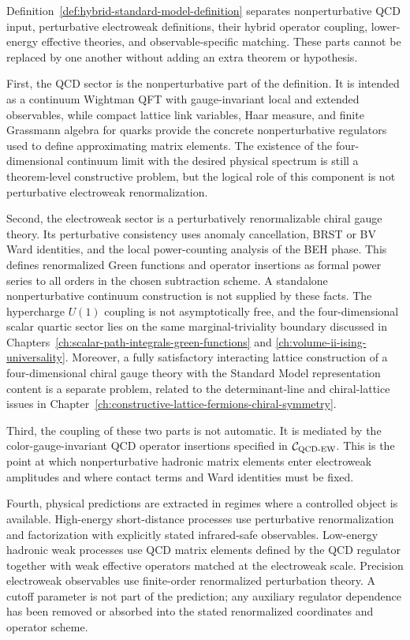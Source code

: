 \begin{remark}
\label{rem:sm-hybrid-logical-layers}
Definition~\ref{def:hybrid-standard-model-definition} separates
nonperturbative QCD input, perturbative electroweak definitions, their hybrid
operator coupling, lower-energy effective theories, and observable-specific
matching.  These parts cannot be replaced by one another without adding an
extra theorem or hypothesis.
\par
First, the QCD sector is the nonperturbative part of the definition.  It is
intended as a continuum Wightman QFT with gauge-invariant local and extended
observables, while compact lattice link variables, Haar measure, and finite
Grassmann algebra for quarks provide the concrete nonperturbative regulators
used to define approximating matrix elements.  The existence of the
four-dimensional continuum limit with the desired physical spectrum is still a
theorem-level constructive problem, but the logical role of this component is
not perturbative electroweak renormalization.

Second, the electroweak sector is a perturbatively renormalizable chiral gauge
theory.  Its perturbative consistency uses anomaly cancellation, BRST or BV
Ward identities, and the local power-counting analysis of the BEH phase.  This
defines renormalized Green functions and operator insertions as formal power
series to all orders in the chosen subtraction scheme.  A standalone
nonperturbative continuum construction is not supplied by these facts.  The
hypercharge \(U(1)\) coupling is not asymptotically free, and the
four-dimensional scalar quartic sector lies on the same marginal-triviality
boundary discussed in Chapters~\ref{ch:scalar-path-integrals-green-functions}
and \ref{ch:volume-ii-ising-universality}.  Moreover, a fully satisfactory
interacting lattice construction of a four-dimensional chiral gauge theory
with the Standard Model representation content is a separate problem, related
to the determinant-line and chiral-lattice issues in
Chapter~\ref{ch:constructive-lattice-fermions-chiral-symmetry}.

Third, the coupling of these two parts is not automatic.  It is mediated by
the color-gauge-invariant QCD operator insertions specified in
\(\mathcal C_{\rm QCD\text{-}EW}\).  This is the point at which
nonperturbative hadronic matrix elements enter electroweak amplitudes and
where contact terms and Ward identities must be fixed.

Fourth, physical predictions are extracted in regimes where a controlled
object is available.  High-energy short-distance processes use perturbative
renormalization and factorization with explicitly stated infrared-safe
observables.  Low-energy hadronic weak processes use QCD matrix elements
defined by the QCD regulator together with weak effective operators matched at
the electroweak scale.  Precision electroweak observables use finite-order
renormalized perturbation theory.  A cutoff parameter is not part of the
prediction; any auxiliary regulator dependence has been removed or absorbed
into the stated renormalized coordinates and operator scheme.
\end{remark}


